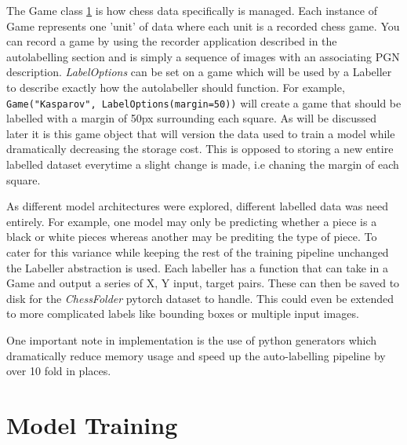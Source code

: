 The Game class \ref{} is how chess data specifically is managed.  Each instance of Game represents one 'unit' of data where each unit is a recorded chess game.
You can record a game by using the recorder application described in the autolabelling section and is simply a sequence of images with
an associating PGN description. \textit{LabelOptions} can be set on a game which will be used by a Labeller to describe exactly how the autolabeller 
should function.  For example, \verb|Game("Kasparov", LabelOptions(margin=50))| will create a game that should be labelled
with a margin of 50px surrounding each square.  As will be discussed later it is this game object that will version the data used to train a model while dramatically
decreasing the storage cost.  This is opposed to storing a new entire labelled dataset everytime a slight change is made, i.e chaning the margin of each square.

As different model architectures were explored, different labelled data was need entirely.  For example, one model may only be 
predicting whether a piece is a black or white pieces whereas another may be prediting the type of piece.  To cater for this variance while keeping the rest of the 
training pipeline unchanged the Labeller abstraction is used.  Each labeller has a function that can take in a Game and output a series of X, Y input, target pairs.
These can then be saved to disk for the \textit{ChessFolder} pytorch dataset to handle. 
This could even be extended to more complicated labels like bounding boxes or multiple input images.

One important note in implementation is the use of python generators which dramatically reduce memory usage and speed up the auto-labelling pipeline by over 10 fold in 
places.

\section{Model Training}

